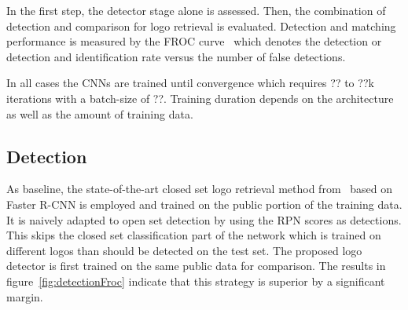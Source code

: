 \documentclass[a4paper,twoside]{article}
\begin{document}
In the first step, the detector stage alone is assessed. Then, the combination of detection and comparison for logo retrieval is evaluated. 
Detection and matching performance is measured by the \ac{FROC} curve~\cite{miller1969} which denotes the detection or detection and identification rate versus the number of false detections.

In all cases the \acp{CNN} are trained until convergence which requires ?? to ??k iterations with a batch-size of ??. Training duration depends on the architecture as well as the amount of training data.

\subsection{Detection}
As baseline, the state-of-the-art closed set logo retrieval method from~\cite{su2016} based on Faster R-CNN is employed and trained on the public portion of the training data.
It is naively adapted to open set detection by using the RPN scores as detections. This skips the closed set classification part of the network which is trained on different logos than should be detected on the test set.
The proposed logo detector is first trained on the same public data for comparison. The results in figure~\ref{fig:detectionFroc} indicate that this strategy is superior by a significant margin. 
%
\end{document}
